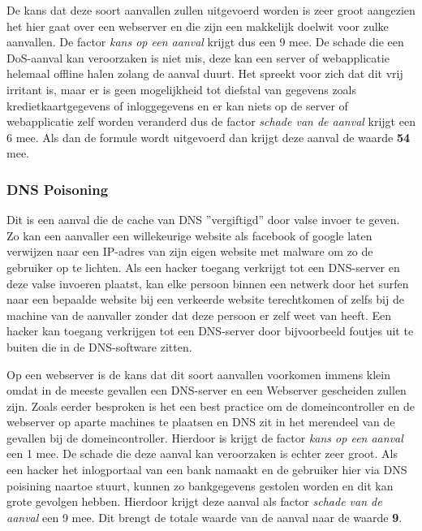 \documentclass[pdftex,a4paper,12pt]{report}
\begin{document}
De kans dat deze soort aanvallen zullen uitgevoerd worden is zeer groot aangezien het hier gaat over een webserver en die zijn een makkelijk doelwit voor zulke aanvallen. De factor \textit{kans op een aanval} krijgt dus een 9 mee. De schade die een DoS-aanval kan veroorzaken is niet mis, deze kan een server of webapplicatie helemaal offline halen zolang de aanval duurt. Het spreekt voor zich dat dit vrij irritant is, maar er is geen mogelijkheid tot diefstal van gegevens zoals kredietkaartgegevens of inloggegevens en er kan niets op de server of webapplicatie zelf worden veranderd dus de factor \textit{schade van de aanval} krijgt een 6 mee. Als dan de formule wordt uitgevoerd dan krijgt deze aanval de waarde \textbf{54} mee.

\subsubsection{DNS Poisoning}
Dit is een aanval die de cache van DNS ''vergiftigd'' door valse invoer te geven. Zo kan een aanvaller een willekeurige website als facebook of google laten verwijzen naar een IP-adres van zijn eigen website met malware om zo de gebruiker op te lichten. Als een hacker toegang verkrijgt tot een DNS-server en deze valse invoeren plaatst, kan elke persoon binnen een netwerk door het surfen naar een bepaalde website bij een verkeerde website terechtkomen of zelfs bij de machine van de aanvaller zonder dat deze persoon er zelf weet van heeft. Een hacker kan toegang verkrijgen tot een DNS-server door bijvoorbeeld foutjes uit te buiten die in de DNS-software zitten. \citep{Hoffm2015} \newline

Op een webserver is de kans dat dit soort aanvallen voorkomen immens klein omdat in de meeste gevallen een DNS-server en een Webserver gescheiden zullen zijn. Zoals eerder besproken is het een best practice om de domeincontroller en de webserver op aparte machines te plaatsen en DNS zit in het merendeel van de gevallen bij de domeincontroller. Hierdoor is krijgt de factor \textit{kans op een aanval} een 1 mee. De schade die deze aanval kan veroorzaken is echter zeer groot. Als een hacker het inlogportaal van een bank namaakt en de gebruiker hier via DNS poisining naartoe stuurt, kunnen zo bankgegevens gestolen worden en dit kan grote gevolgen hebben. Hierdoor krijgt deze aanval als factor \textit{schade van de aanval} een 9 mee. Dit brengt de totale waarde van de aanval naar de waarde \textbf{9}.
\end{document}
